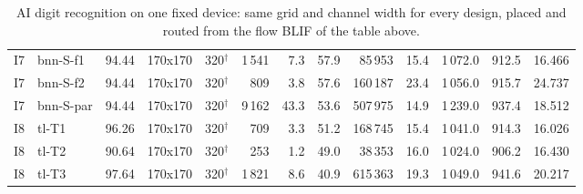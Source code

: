 \begin{table}[t]
\begin{tabular}{llrlrrrrrrrrr}
I7 & bnn-S-f1 & 94.44 & 170x170 & 320$^\dagger$ & 1\,541 & 7.3 & 57.9 & 85\,953 & 15.4 & 1\,072.0 & 912.5 & 16.466 \\
I7 & bnn-S-f2 & 94.44 & 170x170 & 320$^\dagger$ & 809 & 3.8 & 57.6 & 160\,187 & 23.4 & 1\,056.0 & 915.7 & 24.737 \\
I7 & bnn-S-par & 94.44 & 170x170 & 320$^\dagger$ & 9\,162 & 43.3 & 53.6 & 507\,975 & 14.9 & 1\,239.0 & 937.4 & 18.512 \\
\midrule
I8 & tl-T1 & 96.26 & 170x170 & 320$^\dagger$ & 709 & 3.3 & 51.2 & 168\,745 & 15.4 & 1\,041.0 & 914.3 & 16.026 \\
I8 & tl-T2 & 90.64 & 170x170 & 320$^\dagger$ & 253 & 1.2 & 49.0 & 38\,353 & 16.0 & 1\,024.0 & 906.2 & 16.430 \\
I8 & tl-T3 & 97.64 & 170x170 & 320$^\dagger$ & 1\,821 & 8.6 & 40.9 & 615\,363 & 19.3 & 1\,049.0 & 941.6 & 20.217 \\
\bottomrule
\end{tabular}
\caption{AI digit recognition on one fixed device: same grid and channel width for every design, placed and routed from the flow BLIF of the table above.}
\label{tab:aidigit-fixed}
\end{table}
